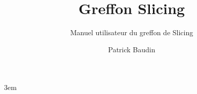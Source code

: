 \documentclass[lang=french]{frama-c-book}
\title{Greffon Slicing}
\subtitle{Manuel utilisateur du greffon de Slicing}
\author{Patrick Baudin}
\begin{document}
\sloppy
\emergencystretch 3em

\maketitle


\end{document}
